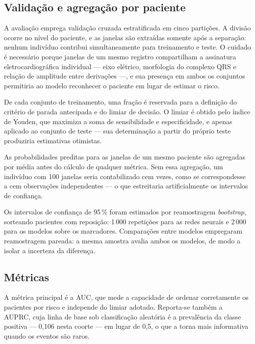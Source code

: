 \subsection{Validação e agregação por paciente}
\label{subsec:config-avaliacao}

A avaliação emprega validação cruzada estratificada em cinco partições. A
divisão ocorre no nível do paciente, e as janelas são extraídas somente após
a separação: nenhum indivíduo contribui simultaneamente para treinamento e
teste. O cuidado é necessário porque janelas de um mesmo registro
compartilham a assinatura eletrocardiográfica individual --- eixo elétrico,
morfologia do complexo QRS e relação de amplitude entre derivações ---, e sua
presença em ambos os conjuntos permitiria ao modelo reconhecer o paciente em
lugar de estimar o risco.

De cada conjunto de treinamento, uma fração é reservada para a definição do
critério de parada antecipada e do limiar de decisão. O limiar é obtido pelo
índice de Youden, que maximiza a soma de sensibilidade e especificidade, e
apenas aplicado ao conjunto de teste --- sua determinação a partir do próprio
teste produziria estimativas otimistas.

As probabilidades preditas para as janelas de um mesmo paciente são
agregadas por média antes do cálculo de qualquer métrica. Sem essa agregação,
um indivíduo com 100 janelas seria contabilizado cem vezes, como se
correspondesse a cem observações independentes --- o que estreitaria
artificialmente os intervalos de confiança.

Os intervalos de confiança de 95\,\% foram estimados por reamostragem
\textit{bootstrap}, sorteando pacientes com reposição: 1\,000 repetições
para as redes neurais e 2\,000 para os modelos sobre os marcadores.
Comparações entre modelos empregaram reamostragem pareada: a mesma amostra
avalia ambos os modelos, de modo a isolar a incerteza da diferença.

\subsection{Métricas}
\label{subsec:config-metricas}

A métrica principal é a \gls{AUC}, que mede a capacidade de ordenar
corretamente os pacientes por risco e independe do limiar adotado. Reporta-se
também a \gls{AUPRC}, cuja linha de base sob classificação aleatória é a
prevalência da classe positiva --- 0,106 nesta coorte --- em lugar de 0,5, o
que a torna mais informativa quando os eventos são raros.

